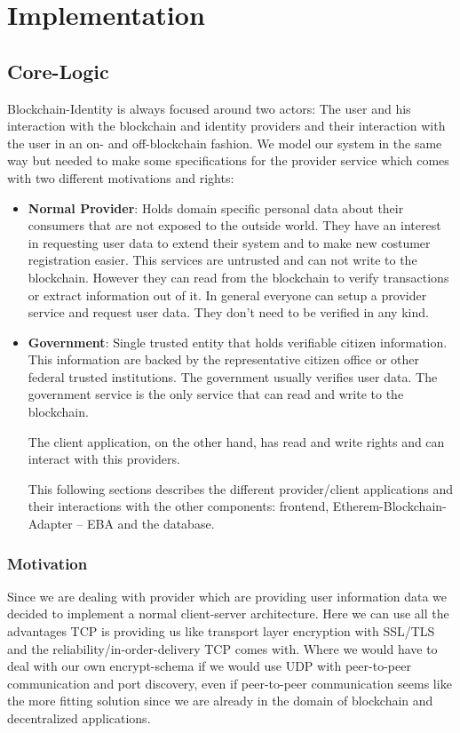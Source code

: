\chapter{Implementation}
\label{cha:implementation}

\section{Core-Logic}
Blockchain-Identity is always focused around two actors: The user and his interaction with the blockchain and identity
providers and their interaction with the user in an on- and off-blockchain fashion. We model our system in the same way
but needed to make some specifications for the provider service which comes with two different motivations and rights:

\begin{itemize}
\item \textbf{Normal Provider}: Holds domain specific personal data about their consumers that are not exposed to the
outside world. They have an interest in requesting user data to extend their system and to make new costumer
registration easier. This services are untrusted and can not write to the blockchain. However they can read from the
blockchain to verify transactions or extract information out of it. In general everyone can setup a provider service
and request user data. They don’t need to be verified in any kind.
\item \textbf{Government}: Single trusted entity that holds verifiable citizen information. This information are backed
by the representative citizen office or other federal trusted institutions. The government usually verifies user data.
The government service is the only service that can read and write to the blockchain. 

The client application, on the other hand, has read and write rights and can interact with this providers.

This following sections describes the different provider/client applications and their interactions with the other
components: frontend, Etherem-Blockchain-Adapter – EBA and the database.
\end{itemize}

\subsection{Motivation}
Since we are dealing with provider which are providing user information data we decided to implement a normal
client-server architecture. Here we can use all the advantages TCP is providing us like transport layer encryption with
SSL/TLS and the reliability/in-order-delivery TCP comes with. Where we would have to deal with our own encrypt-schema
if we would use UDP with peer-to-peer communication and port discovery, even if peer-to-peer communication seems like
the more fitting solution since we are already in the domain of blockchain and decentralized applications.


